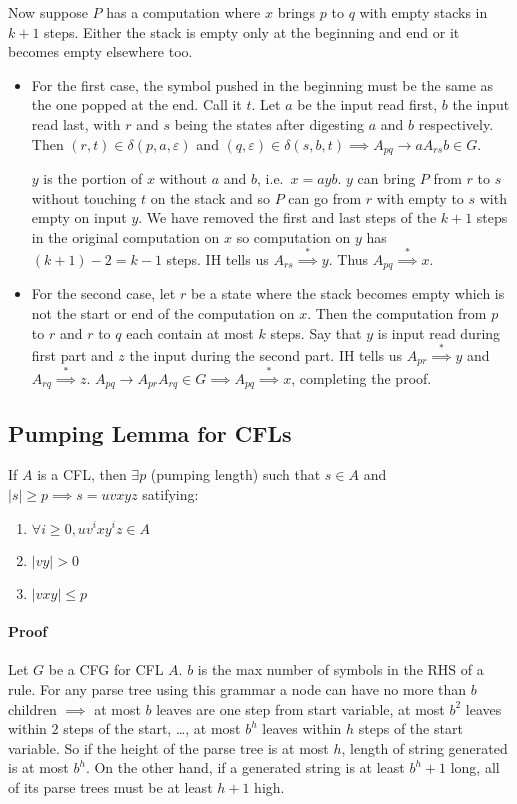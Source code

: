 \documentclass[12 pt]{article}
\begin{document}
Now suppose $P$ has a computation where $x$ brings $p$ to $q$ with
empty stacks in $k+1$ steps. Either the stack is empty only at the
beginning and end or it becomes empty elsewhere too.
\begin{itemize}
\item For the first case, the symbol pushed in the beginning must be
  the same as the one popped at the end. Call it $t$. Let $a$ be the
  input read first, $b$ the input read last, with $r$ and $s$ being
  the states after digesting $a$ and $b$ respectively. Then $(r,t)\in
  \delta(p,a,\varepsilon)$ and $(q,\varepsilon) \in \delta(s,b,t)
  \implies A_{pq} \to aA_{rs}b \in G$.

  $y$ is the portion of $x$ without $a$ and $b$, i.e.\ $x = ayb$. $y$ can bring $P$ from $r$ to $s$
  without touching $t$ on the stack and so $P$ can go from $r$ with
  empty to $s$ with empty on input $y$. We have removed the first and
  last steps of the $k+1$ steps in the original computation on $x$ so
  computation on $y$ has $(k+1) - 2 = k- 1$ steps. IH tells us $A_{rs}
  \stackrel{*}{\implies} y$. Thus $A_{pq} \stackrel{*}{\implies} x$.
\item For the second case, let $r$ be a state where the stack becomes
  empty which is not the start or end of the computation on $x$. Then
  the computation from $p$ to $r$ and $r$ to $q$ each contain at most
  $k$ steps. Say that $y$ is input read during first part and $z$ the
  input during the second part. IH tells us $A_{pr}
  \stackrel{*}{\implies} y$ and $A_{rq} \stackrel{*}{\implies}
  z$. $A_{pq} \to A_{pr}A_{rq} \in G \implies A_{pq}
  \stackrel{*}{\implies} x$, completing the proof.
\end{itemize}
\subsection{Pumping Lemma for CFLs}
If $A$ is a CFL, then $\exists p$ (pumping length) such that $s \in A$
and $|s| \geq p \implies s = uvxyz$ satifying:
\begin{enumerate}
\item $\forall i \geq 0, uv^ixy^iz \in A$
\item $|vy| > 0$
\item $|vxy| \leq p$
\end{enumerate}
\paragraph{Proof}
Let $G$ be a CFG for CFL $A$. $b$ is the max number of symbols in the
RHS of a rule. For any parse tree using this grammar a node can have
no more than $b$ children $\implies$ at most $b$ leaves are one step
from start variable, at most $b^2$ leaves within $2$ steps of the
start, \ldots, at most $b^h$ leaves within $h$ steps of the start
variable. So if the height of the parse tree is at most $h$, length of
string generated is at most $b^h$. On the other hand, if a generated
string is at least $b^h + 1$ long, all of its parse trees must be at
least $h+1$ high.
\end{document}
